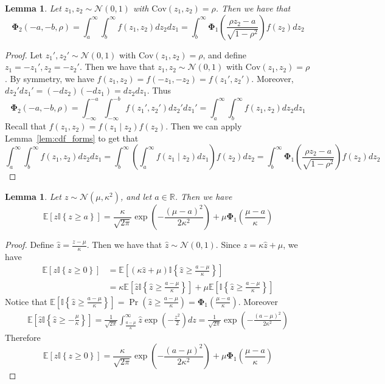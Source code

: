 \documentclass[10pt]{article} %
\newtheorem{lemma}[theorem]{Lemma}
\theoremstyle{definition}
\theoremstyle{plain}
\newcommand{\paren}[1]{\left(#1\right)}
\newcommand{\indy}[1]{\mathbb{I}\left\{#1\right\}}
\providecommand{\E}{\mathbb{E}}
\providecommand{\R}{\mathbb{R}}
\begin{document}
\begin{lemma}
    \label{lem:joint_cdf_forms}
    Let $z_1,z_2\sim\mathcal{N}\paren{0,1}$ with $\text{Cov}\paren{z_1, z_2} = \rho$. Then we have that
    \[
        \bm{\Phi}_2\paren{-a, -b, \rho} = \int_a^\infty\int_b^\infty f\paren{z_1, z_2}dz_2dz_1 = \int_b^\infty\bm{\Phi}_1\paren{\frac{\rho z_2 - a}{\sqrt{1-\rho^2}}}f\paren{z_2}dz_2
    \]
\end{lemma}
\begin{proof}
    Let $z_1',z_2'\sim\mathcal{N}\paren{0, 1}$ with $\text{Cov}\paren{z_1, z_2} = \rho$, and define $z_1 = -z_1', z_2 = -z_2'$. Then we have that $z_1,z_2\sim\mathcal{N}\paren{0,1}$ with $\text{Cov}\paren{z_1, z_2} = \rho$. By symmetry, we have $f\paren{z_1, z_2} = f\paren{-z_1, -z_2} = f\paren{z_1', z_2'}$. Moreover, $dz_2'dz_1' = \paren{-dz_2}\paren{-dz_1} = dz_2dz_1$. Thus
    \[
        \bm{\Phi}_2\paren{-a, -b, \rho} = \int_{-\infty}^{-a}\int_{-\infty}^{-b}f\paren{z_1', z_2'}dz_2'dz_1' = \int_{a}^\infty\int_b^\infty f\paren{z_1,z_2}dz_2dz_1
    \]
    Recall that $f\paren{z_1, z_2} = f\paren{z_1\mid z_2}f\paren{z_2}$. Then we can apply Lemma~\ref{lem:cdf_forms} to get that
    \[
        \int_{a}^\infty\int_b^\infty f\paren{z_1,z_2}dz_2dz_1 =\int_b^\infty\paren{\int_a^\infty f\paren{z_1\mid z_2}dz_1}f\paren{z_2}dz_2 = \int_b^\infty\bm{\Phi}_1\paren{\frac{\rho z_2-a}{\sqrt{1-\rho^2}}}f\paren{z_2}dz_2
    \]
\end{proof}

\begin{lemma}
    \label{lem:exp_relu}
    Let $z\sim\mathcal{N}\paren{\mu, \kappa^2}$, and let $a\in\R$. Then we have
    \[
        \E\left[z\indy{z\geq a}\right] = \frac{\kappa}{\sqrt{2\pi}}\exp\paren{-\frac{\paren{\mu-a}^2}{2\kappa^2}} + \mu\bm{\Phi}_1\paren{\frac{\mu-a}{\kappa}}
    \]
\end{lemma}
\begin{proof}
    Define $\hat{z} = \frac{z - \mu}{\kappa}$. Then we have that $\hat{z} \sim\mathcal{N}\paren{0, 1}$. Since $z = \kappa\hat{z} + \mu$, we have
    \begin{align*}
        \E\left[z\indy{z\geq 0}\right] & = \E\left[\paren{\kappa\hat{z} + \mu}\indy{\hat{z}\geq \frac{a-\mu}{\kappa}}\right]\\
        & = \kappa\E\left[\hat{z}\indy{\hat{z}\geq \frac{a-\mu}{\kappa}}\right] + \mu\E\left[\indy{\hat{z}\geq \frac{a-\mu}{\kappa}}\right]
    \end{align*}
    Notice that $\E\left[\indy{\hat{z}\geq \frac{a-\mu}{\kappa}}\right] = \Pr\paren{\hat{z}\geq \frac{a-\mu}{\kappa}} = \bm{\Phi}_1\paren{\frac{\mu-a}{\kappa}}$. Moreover
    \begin{align*}
        \E\left[\hat{z}\indy{\hat{z}\geq -\frac{\mu}{\kappa}}\right] = \frac{1}{\sqrt{2\pi}}\int_{\frac{a-\mu}{\kappa}}^\infty \hat{z}\exp\paren{-\frac{z^2}{2}}dz = \frac{1}{\sqrt{2\pi}}\exp\paren{-\frac{\paren{a-\mu}^2}{2\kappa^2}}
    \end{align*}
    Therefore
    \[
        \E\left[z\indy{z\geq 0}\right] = \frac{\kappa}{\sqrt{2\pi}}\exp\paren{-\frac{\paren{a-\mu}^2}{2\kappa^2}} + \mu\bm{\Phi}_1\paren{\frac{\mu-a}{\kappa}}
    \]
\end{proof}
\end{document}
